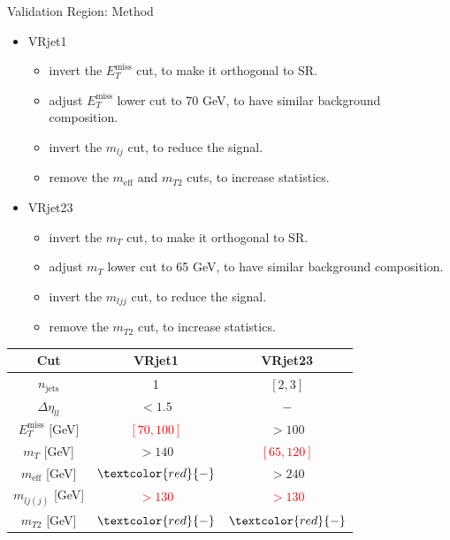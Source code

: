 \documentclass[mathserif,serif]{beamer}
\begin{document}
\begin{frame}{Validation Region: Method}
\begin{itemize}
\item VRjet1
\begin{itemize}
\scriptsize
\item invert the $E_T^{\text{miss}}$ cut, to make it orthogonal to SR.
\item adjust $E_T^{\text{miss}}$ lower cut to 70 GeV, to have similar background composition.
\item invert the $m_{lj}$ cut, to reduce the signal.
\item remove the $m_{\text{eff}}$ and $m_{T2}$ cuts, to increase statistics.
\end{itemize}
\item VRjet23
\begin{itemize}
\scriptsize
\item invert the $m_{T}$ cut, to make it orthogonal to SR.
\item adjust $m_{T}$ lower cut to 65 GeV, to have similar background composition.
\item invert the $m_{ljj}$ cut, to reduce the signal.
\item remove the $m_{T2}$ cut, to increase statistics.
\end{itemize}
\end{itemize}
\begin{table}[htbp]
\begin{center}
\begin{tabular}{|c|c|c|}
\hline
Cut & VRjet1 & VRjet23 \\
\hline
\hline
$n_{\text{jets}}$               & 1                             & $[2,3]$ \\
$\Delta \eta_{ll}$              & $<1.5$                        & $-$ \\
$E_T^{\text{miss}}$ [GeV]       & \textcolor{red}{ $[70,100]$ } & $>100$ \\
$m_T$ [GeV]                     & $>140$                        & \textcolor{red}{$[65,120]$} \\
$m_{\text{eff}}$ [GeV]          & $\textcolor{red}{-}$          & $>240$ \\
$m_{lj(j)}$ [GeV]               & \textcolor{red}{$>130$}       & \textcolor{red}{$>130$} \\
$m_{T2}$ [GeV]                  & $\textcolor{red}{-}$          & $\textcolor{red}{-}$ \\
\hline
\end{tabular}
\end{center}
\end{table}
\end{frame}
\end{document}

